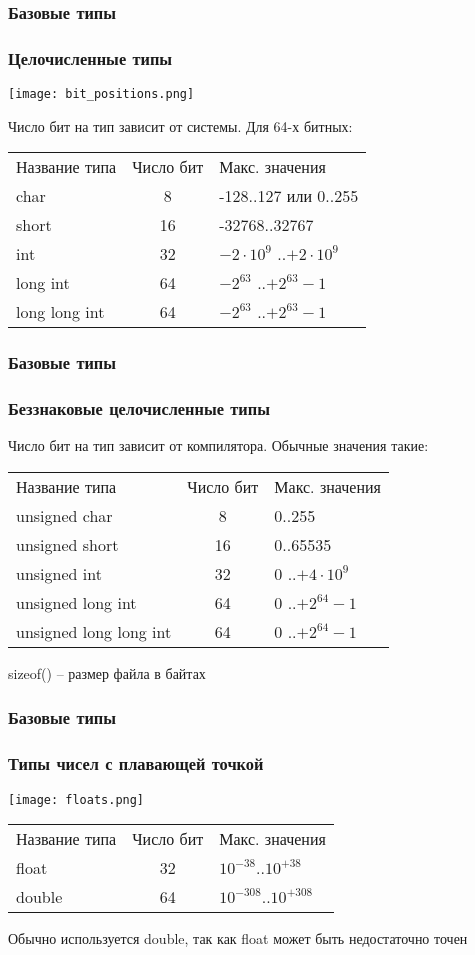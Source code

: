 \documentclass[12pt,pdf,hyperref={unicode}]{beamer}
\begin{document}
\begin{frame}
\frametitle{Базовые типы}
\frametitle{Целочисленные типы} 
\begin{center}
\texttt{[image: bit\_positions.png]}
\end{center}
Число бит на тип зависит от системы. Для 64-х битных:
\begin{center}
\begin{tabular}{ l c l }
  Название типа & Число бит & Макс. значения \\
  char & 8 & -128..127 или 0..255 \\
  short & 16 & -32768..32767 \\
  int & 32 & $-2 \cdot 10^9$ ..$+2 \cdot 10^9$ \\
  long int & 64& $-2^{63}$ ..$+2^{63}-1$ \\
  long long int & 64 & $-2^{63}$ ..$+2^{63}-1$ \\
\end{tabular}
\end{center}
\end{frame}

\begin{frame}
\frametitle{Базовые типы}
\frametitle{Беззнаковые целочисленные типы} 
Число бит на тип зависит от компилятора. Обычные значения такие:
\begin{center}
\begin{tabular}{ l c l }
  Название типа & Число бит & Макс. значения \\
  unsigned char & 8 & 0..255 \\
  unsigned short & 16 & 0..65535 \\
  unsigned int & 32 & $0$ ..$+4 \cdot 10^9$ \\
  unsigned long int & 64& $0$ ..$+2^{64}-1$ \\
  unsigned long long int & 64 & $0$ ..$+2^{64}-1$ \\
\end{tabular}
\end{center}
sizeof() -- размер файла в байтах
\end{frame}


\begin{frame}
\frametitle{Базовые типы}
\frametitle{Типы чисел с плавающей точкой} 
\texttt{[image: floats.png]}
\begin{center}
\begin{tabular}{ l c l }
  Название типа & Число бит & Макс. значения \\
  float & 32 & $10^{-38}$..$10^{+38}$ \\
  double & 64 & $10^{-308}$..$10^{+308}$ \\
\end{tabular}
\end{center}
Обычно используется double, так как float может быть недостаточно точен
\end{frame}
\end{document}

